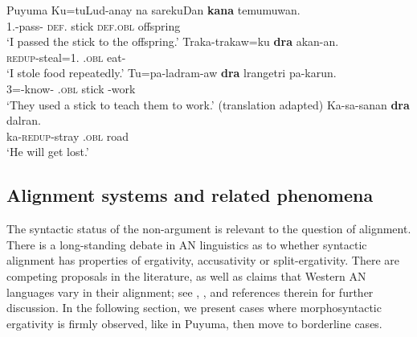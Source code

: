 \documentclass[output=paper,chinesefont]{../langscibook}
\begin{document}
\ea\label{ex:Austronesian:37} Puyuma
\ea\gll
Ku=tuLud-anay na sarekuDan \textbf{kana} temumuwan.\\
  {1\SG}.\GEN-pass-{\IV} \textsc{def}.{\NOM} stick  \textsc{def}.\textsc{obl} offspring\\
\glt`I passed the stick to the offspring.' \citep[23]{Teng2005}
\ex\gll
Traka-trakaw=ku \textbf{dra} akan-an.\\
\textlangle{\AV}{\textrangle}\textsc{redup}-steal=1\SG.{\NOM} \INDF.\textsc{obl} eat-\NMLZ\\
\glt`I stole food repeatedly.' \citep[146]{Teng2008}
\ex\gll
Tu=pa-ladram-aw \textbf{dra} lrangetri pa-karun.\\
3{\GEN}=\CAUS-know-{\PV} \INDF.\textsc{obl} stick \CAUS-work\\
\glt`They used a stick to teach them to work.' \citep[245]{Teng2008} (translation adapted)
\ex\gll
Ka-sa-sanan \textbf{dra} dalran.\\
ka-\textsc{redup}-stray \INDF.\textsc{obl} road\\
\glt`He will get lost.' \citep[168]{Teng2008}
\z\z

\subsection{Alignment systems and related phenomena}
\label{sec:Austronesian:4.3}

The syntactic status of the non-\SUBJ argument is relevant to the question of alignment. There is a long-standing debate in AN linguistics as to whether syntactic alignment has properties of ergativity, accusativity or split-ergativity. There are competing proposals in the literature, as well as claims that Western AN languages vary in their alignment; see \citet{Aldridge2004},  \citet{Katagiri2005}, and references therein for further discussion.  In the following section, we present cases where morphosyntactic ergativity is firmly observed, like in Puyuma, then move to borderline cases.
\end{document}
